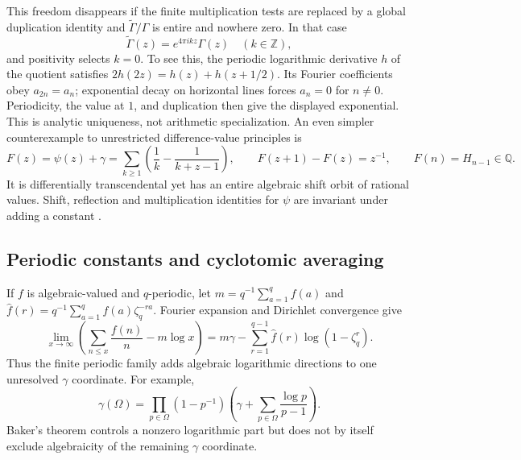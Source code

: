 \documentclass[11pt,a4paper]{article}
\newcommand{\Q}{\mathbb Q}
\newcommand{\Z}{\mathbb Z}
\theoremstyle{definition}
\theoremstyle{remark}
\numberwithin{equation}{section}
\begin{document}
This freedom disappears if the finite multiplication tests are replaced by
a global duplication identity and $\widetilde\Gamma/\Gamma$ is entire and
nowhere zero.  In that case
\[
 \widetilde\Gamma(z)=e^{4\pi ikz}\Gamma(z)\quad(k\in\Z),
\]
and positivity selects $k=0$.  To see this, the periodic logarithmic
derivative $h$ of the quotient satisfies
$2h(2z)=h(z)+h(z+1/2)$.  Its Fourier coefficients obey $a_{2n}=a_n$;
exponential decay on horizontal lines forces $a_n=0$ for $n\ne0$.
Periodicity, the value at $1$, and duplication then give the displayed
exponential.  This is analytic uniqueness, not arithmetic specialization.
An even simpler counterexample to unrestricted difference-value principles
is
\[
 F(z)=\psi(z)+\gamma=
 \sum_{k\ge1}\left(\frac1k-\frac1{k+z-1}\right),\qquad
 F(z+1)-F(z)=z^{-1},\qquad F(n)=H_{n-1}\in\Q.
\]
It is differentially transcendental yet has an entire algebraic shift orbit
of rational values.  Shift, reflection and multiplication identities for
$\psi$ are invariant under adding a constant \cite{ar:DLMFGamma}.

\subsection{Periodic constants and cyclotomic averaging}
If $f$ is algebraic-valued and $q$-periodic, let
$m=q^{-1}\sum_{a=1}^qf(a)$ and
$\widehat f(r)=q^{-1}\sum_{a=1}^qf(a)\zeta_q^{-ra}$.  Fourier expansion
and Dirichlet convergence give
\begin{equation}\label{ar:periodic}
 \lim_{x\to\infty}\left(\sum_{n\le x}\frac{f(n)}n-m\log x\right)
 =m\gamma-\sum_{r=1}^{q-1}\widehat f(r)\log(1-\zeta_q^r).
\end{equation}
Thus the finite periodic family adds algebraic logarithmic directions to
one unresolved $\gamma$ coordinate.  For example,
\[
 \gamma(\Omega)=\prod_{p\in\Omega}(1-p^{-1})
 \left(\gamma+\sum_{p\in\Omega}\frac{\log p}{p-1}\right).
\]
Baker's theorem controls a nonzero logarithmic part but does not by itself
exclude algebraicity of the remaining $\gamma$ coordinate.
\end{document}
